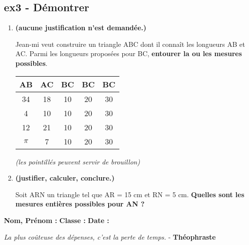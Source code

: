 \subsection*{ex3 - Démontrer}

\begin{enumerate}
  \item[1.] \textbf{(aucune justification n'est demandée.)}

    Jean-mi veut construire un triangle ABC dont il connaît les longueurs AB et AC. \newline
    Parmi les longueurs proposées pour BC, \textbf{entourer la ou les mesures possibles}.

    \begin{multicols}{2}
      \begin{tabular}{|c|c||c|c|c|}
        \hline
          AB & AC & BC & BC & BC\\ \hline
          34 & 18 & 10 & 20 & 30\\ \hline
           4 & 10 & 10 & 20 & 30\\ \hline
          12 & 21 & 10 & 20 & 30\\ \hline
       $\pi$ &  7 & 10 & 20 & 30\\ \hline
      \end{tabular}
      
      \columnbreak

      \textit{(les pointillés peuvent servir de brouillon)}
      \Pointilles[4]
    \end{multicols}

  \item[2.] \textbf{(justifier, calculer, conclure.)}
  
  Soit ARN un triangle tel que AR = 15 cm et RN = 5 cm. \newline
  \textbf{Quelles sont les mesures entières possibles pour AN ?}

  \Pointilles[6]
\end{enumerate} 

\newpage

\textbf{Nom, Prénom :} \hspace{8cm} \textbf{Classe :} \hspace{3cm} \textbf{Date :}\\

\begin{center}
  \textit{La plus coûteuse des dépenses, c’est la perte de temps.}  - \textbf{Théophraste}
\end{center}

